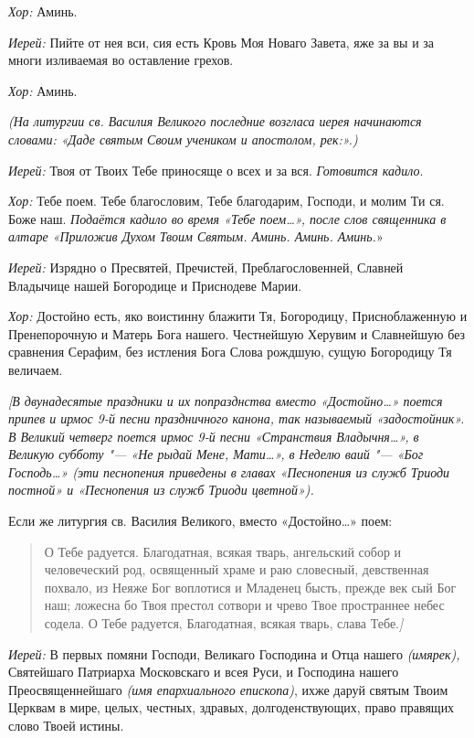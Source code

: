 \begin{mymulticols}
  {\itshape Хор:} Аминь.
  
  {\itshape Иерей:} Пийте от нея вси, сия есть Кровь Моя Новаго Завета, яже за вы и за многи изливаемая во оставление грехов.
  
  {\itshape Хор:} Аминь. 


  {\itshape (На литургии св. Василия Великого последние возгласа иерея начинаются словами: «Даде святым Своим учеником и апостолом, рек:».)}


 {\itshape Иерей:} Твоя от Твоих Тебе приносяще о всех и за вся.  {\itshape Готовится кадило}.

{\itshape Хор:} Тебе поем. Тебе благословим, Тебе благодарим, Господи, и молим Ти ся. Боже наш.  {\itshape Подаётся кадило во время «Тебе поем…», после слов священника в алтаре «Приложив Духом Твоим Святым. Аминь. Аминь. Аминь.}»

{\itshape Иерей:} Изрядно о Пресвятей, Пречистей, Преблагословенней, Славней Владычице нашей Богородице и Приснодеве Марии.

{\itshape Хор:} Достойно есть, яко воистинну блажити Тя, Богородицу, Присноблаженную и Пренепорочную и Матерь Бога нашего. Честнейшую Херувим и Славнейшую без сравнения Серафим, без истления Бога Слова рождшую, сущую Богородицу Тя величаем. 


 {\itshape [В двунадесятые праздники и их попразднства вместо «Достойно…» поется припев и ирмос 9-й песни праздничного канона, так называемый «задостойник». В Великий четверг поется ирмос 9-й песни «Странствия Владычня…», в Великую субботу "--- «Не рыдай Мене, Мати…», в Неделю ваий "--- «Бог Господь…» (эти песнопения приведены в главах «Песнопения из служб Триоди постной» и «Песнопения из служб Триоди цветной»).


 Если же литургия св. Василия Великого, вместо «Достойно…» поем: }

\begin{quote}
      О Тебе радуется. Благодатная, всякая тварь, ангельский собор и человеческий род, освященный храме и раю словесный, девственная похвало, из Неяже Бог воплотися и Младенец бысть, прежде век сый Бог наш; ложесна бо Твоя престол сотвори и чрево Твое пространнее небес содела. О Тебе радуется, Благодатная, всякая тварь, слава Тебе.{\itshape ]}
\end{quote}      


 {\itshape Иерей:} В первых помяни Господи, Великаго Господина и Отца нашего  {\itshape  (имярек),} Святейшаго Патриарха Московскаго и всея Руси, и Господина нашего Преосвященнейшаго {\itshape (имя епархиального епископа)}, ихже даруй святым Твоим Церквам в мире, целых, честных, здравых, долгоденствующих, право правящих слово Твоей истины. 


\end{mymulticols}
